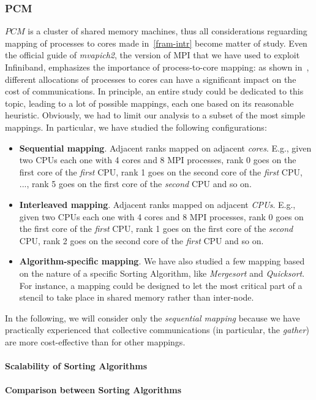 \subsubsection{PCM}
$PCM$ is a cluster of shared memory machines, thus all considerations reguarding mapping of processes to cores made in~\ref{fram-intr} become matter of study. Even the official guide of \textit{mvapich2}, the version of MPI that we have used to exploit Infiniband, emphasizes the importance of process-to-core mapping: as shown in~\cite{MVAPICH2-MAPPING}, different allocations of processes to cores can have a significant impact on the cost of communications. In principle, an entire study could be dedicated to this topic, leading to a lot of possible mappings, each one based on its reasonable heuristic. Obviously, we had to limit our analysis to a subset of the most simple mappings. In particular, we have studied the following configurations:   
\begin{itemize}
\item \textbf{Sequential mapping}. Adjacent ranks mapped on adjacent \textit{cores}. E.g., given two CPUs each one with 4 cores and 8 MPI processes, rank 0 goes on the first core of the \textit{first} CPU, rank 1 goes on the second core of the \textit{first} CPU, ..., rank 5 goes on the first core of the \textit{second} CPU and so on.
\item \textbf{Interleaved mapping}. Adjacent ranks mapped on adjacent \textit{CPUs}. E.g., given two CPUs each one with 4 cores and 8 MPI processes, rank 0 goes on the first core of the \textit{first} CPU, rank 1 goes on the first core of the \textit{second} CPU, rank 2 goes on the second core of the \textit{first} CPU and so on.
\item \textbf{Algorithm-specific mapping}. We have also studied a few mapping based on the nature of a specific Sorting Algorithm, like \textit{Mergesort} and \textit{Quicksort}. For instance, a mapping could be designed to let the most critical part of a stencil to take place in shared memory rather than inter-node.  
\end{itemize}
In the following, we will consider only the \textit{sequential mapping} because we have practically experienced that collective communications (in particular, the \textit{gather}) are more cost-effective than for other mappings. 


\paragraph{Scalability of Sorting Algorithms}

\paragraph{Comparison between Sorting Algorithms}

\clearpage